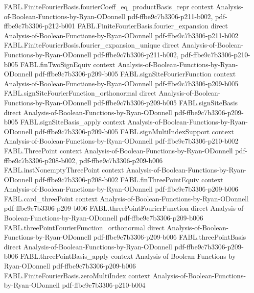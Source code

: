 \begin{theorem}
\proofstep
  {FABL.FiniteFourierBasis.fourierCoeff_eq_productBasis_repr}
  {context}
  {Analysis-of-Boolean-Functions-by-Ryan-ODonnell}
  {pdf-ffbe9c7b3306-p211-b002,
    pdf-ffbe9c7b3306-p212-b001}
\proofstep
  {FABL.FiniteFourierBasis.fourier_expansion}
  {direct}
  {Analysis-of-Boolean-Functions-by-Ryan-ODonnell}
  {pdf-ffbe9c7b3306-p211-b002}
\proofstep
  {FABL.FiniteFourierBasis.fourier_expansion_unique}
  {direct}
  {Analysis-of-Boolean-Functions-by-Ryan-ODonnell}
  {pdf-ffbe9c7b3306-p211-b002,
    pdf-ffbe9c7b3306-p210-b005}
\proofstep
  {FABL.finTwoSignEquiv}
  {context}
  {Analysis-of-Boolean-Functions-by-Ryan-ODonnell}
  {pdf-ffbe9c7b3306-p209-b005}
\proofstep
  {FABL.signSiteFourierFunction}
  {context}
  {Analysis-of-Boolean-Functions-by-Ryan-ODonnell}
  {pdf-ffbe9c7b3306-p209-b005}
\proofstep
  {FABL.signSiteFourierFunction_orthonormal}
  {direct}
  {Analysis-of-Boolean-Functions-by-Ryan-ODonnell}
  {pdf-ffbe9c7b3306-p209-b005}
\proofstep
  {FABL.signSiteBasis}
  {direct}
  {Analysis-of-Boolean-Functions-by-Ryan-ODonnell}
  {pdf-ffbe9c7b3306-p209-b005}
\proofstep
  {FABL.signSiteBasis_apply}
  {context}
  {Analysis-of-Boolean-Functions-by-Ryan-ODonnell}
  {pdf-ffbe9c7b3306-p209-b005}
\proofstep
  {FABL.signMultiIndexSupport}
  {context}
  {Analysis-of-Boolean-Functions-by-Ryan-ODonnell}
  {pdf-ffbe9c7b3306-p210-b002}
\proofstep
  {FABL.ThreePoint}
  {context}
  {Analysis-of-Boolean-Functions-by-Ryan-ODonnell}
  {pdf-ffbe9c7b3306-p208-b002,
    pdf-ffbe9c7b3306-p209-b006}
\proofstep
  {FABL.instNonemptyThreePoint}
  {context}
  {Analysis-of-Boolean-Functions-by-Ryan-ODonnell}
  {pdf-ffbe9c7b3306-p208-b002}
\proofstep
  {FABL.finThreePointEquiv}
  {context}
  {Analysis-of-Boolean-Functions-by-Ryan-ODonnell}
  {pdf-ffbe9c7b3306-p209-b006}
\proofstep
  {FABL.card_threePoint}
  {context}
  {Analysis-of-Boolean-Functions-by-Ryan-ODonnell}
  {pdf-ffbe9c7b3306-p209-b006}
\proofstep
  {FABL.threePointFourierFunction}
  {direct}
  {Analysis-of-Boolean-Functions-by-Ryan-ODonnell}
  {pdf-ffbe9c7b3306-p209-b006}
\proofstep
  {FABL.threePointFourierFunction_orthonormal}
  {direct}
  {Analysis-of-Boolean-Functions-by-Ryan-ODonnell}
  {pdf-ffbe9c7b3306-p209-b006}
\proofstep
  {FABL.threePointBasis}
  {direct}
  {Analysis-of-Boolean-Functions-by-Ryan-ODonnell}
  {pdf-ffbe9c7b3306-p209-b006}
\proofstep
  {FABL.threePointBasis_apply}
  {context}
  {Analysis-of-Boolean-Functions-by-Ryan-ODonnell}
  {pdf-ffbe9c7b3306-p209-b006}
\proofstep
  {FABL.FiniteFourierBasis.zeroMultiIndex}
  {context}
  {Analysis-of-Boolean-Functions-by-Ryan-ODonnell}
  {pdf-ffbe9c7b3306-p210-b004}

\end{theorem}
